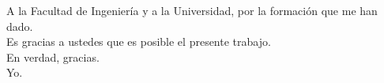 \begin{dedication}
A la Facultad de Ingeniería y a la  Universidad, por la formación que me han dado.\\
Es gracias a ustedes que es posible el presente trabajo.\\
En verdad, gracias.\\
Yo.
\end{dedication}
